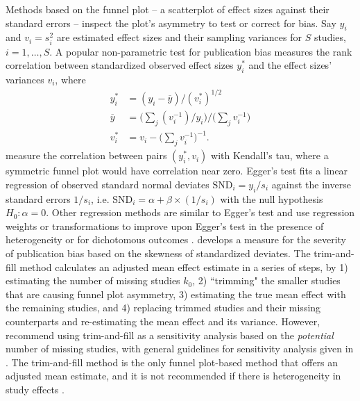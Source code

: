 \documentclass[12pt]{article}   	%
\numberwithin{equation}{section}
\begin{document}
Methods based on the funnel plot \citep{light1984funnel} -- a scatterplot of effect sizes against their standard errors -- inspect the plot's asymmetry to test or correct for bias. Say ${y_i}$ and ${v_i} = {s_i^2}$ are estimated effect sizes and their sampling variances for $S$ studies, $i = 1, \dots, S$. A popular non-parametric test for publication bias \citep{begg1994test} measures the rank correlation between standardized observed effect sizes $y_i^*$ and the effect sizes' variances $v_i$, where 
\begin{align}
y_i^* &= (y_i - \overline{y}) / (v_i^*)^{1/2} \nonumber \\
\overline{y} &= \Big( \sum_j (v_i^{-1})/ y_i \Big) / \Big( \sum_j v_i^{-1} \Big) \nonumber \\
v_i^* &= v_i - \Big( \sum_j v_i^{-1} \Big)^{-1}. \nonumber
\end{align}
\citet{begg1994test} measure the correlation between pairs $(y_i^*, v_i)$ with Kendall's tau, where a symmetric funnel plot would have correlation near zero. Egger's test \citep{egger1997test} fits a linear regression of observed standard normal deviates $\text{SND}_i = y_i / s_i$ against the inverse standard errors $1 / s_i$, i.e. $\text{SND}_i = \alpha + \beta \times (1 / s_i)$  with the null hypothesis $H_0: \alpha = 0$. Other regression methods \citep{macaskill2001test, rucker2008arcsine, thompson1999test, peters2006test} are similar to Egger's test and use regression weights or transformations to improve upon Egger's test in the presence of heterogeneity or for dichotomous outcomes \citep{jin2015methods}. \citet{lin2018test} develops a measure for the severity of publication bias based on the skewness of standardized deviates. The trim-and-fill method \citep{duval2000biom} calculates an adjusted mean effect estimate in a series of steps, by 1) estimating the number of missing studies $k_0$, 2) ``trimming" the smaller studies that are causing funnel plot asymmetry, 3) estimating the true mean effect with the remaining studies, and 4) replacing trimmed studies and their missing counterparts and re-estimating the mean effect and its variance. However, \citet{duval2000biom} recommend using trim-and-fill as a sensitivity analysis based on the \textit{potential} number of missing studies, with general guidelines for sensitivity analysis given in \citet{shi2019trim}. The trim-and-fill method is the only funnel plot-based method that offers an adjusted mean estimate, and it is not recommended if there is heterogeneity in study effects \citep{jin2015methods}.
\end{document}
